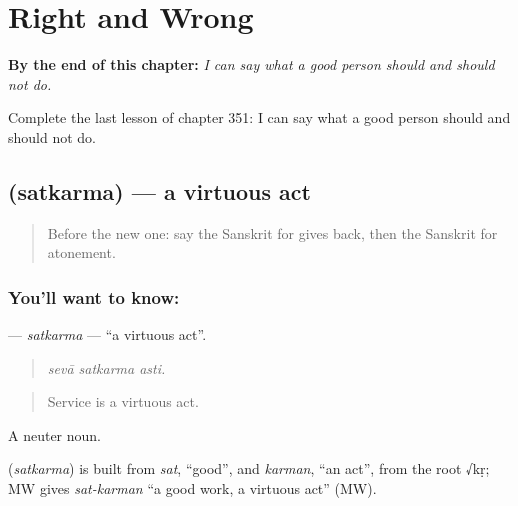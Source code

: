 
\chapter{Right and Wrong}
\label{ch:sa-right-and-wrong}

\begin{chapteropening}
\textbf{By the end of this chapter:} \emph{I can say what a good person should and should not do.}

Complete the last lesson of chapter 351: I can say what a good person should and should not do.
\end{chapteropening}

\section[\texorpdfstring{\sk{सत्कर्म} (satkarma)}{सत्कर्म (satkarma)}]{ (satkarma) — a virtuous act}

\label{lesson:SA-C351-satkarma}



\begin{quote}
Before the new one: say the Sanskrit for gives back, then the Sanskrit for atonement.
\end{quote}

\subsection*{You'll want to know: }
\textbf{} — \emph{satkarma} — \textquotedblleft{}a virtuous act\textquotedblright{}.

\begin{quote}
  
\end{quote}

\begin{quote}
\emph{sevā satkarma asti.}
\end{quote}

\begin{quote}
Service is a virtuous act.
\end{quote}

A neuter noun.

\begin{cousinweb}
\textbf{} (\emph{satkarma}) is built from \emph{sat}, \textquotedblleft{}good\textquotedblright{}, and \emph{karman}, \textquotedblleft{}an act\textquotedblright{}, from the root √kṛ; MW gives \emph{sat-karman} \textquotedblleft{}a good work, a virtuous act\textquotedblright{} (MW).
\end{cousinweb}

